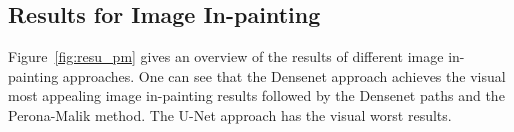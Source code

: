\subsection{Results for Image In-painting}
\label{ssec:num54}

Figure~\ref{fig:resu_pm} gives an overview of the results of different image in-painting approaches. One can see that the Densenet approach achieves the visual most appealing image in-painting results followed by the Densenet paths and the Perona-Malik method. The U-Net approach has the visual worst results.

\begin{table}[H]\begin{center}
\begin{tabular}{ c c c c c c c}
 

\end{tabular}
\end{center}
\end{table}
